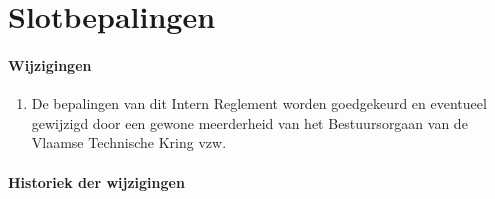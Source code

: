 \part{Slotbepalingen}

    \subsection{Wijzigingen}
    \begin{enumerate}
    \item De bepalingen van dit Intern Reglement worden goedgekeurd en eventueel gewijzigd door een gewone meerderheid van het Bestuursorgaan van de Vlaamse Technische Kring vzw.
    \end{enumerate}

    \subsection{Historiek der wijzigingen}
